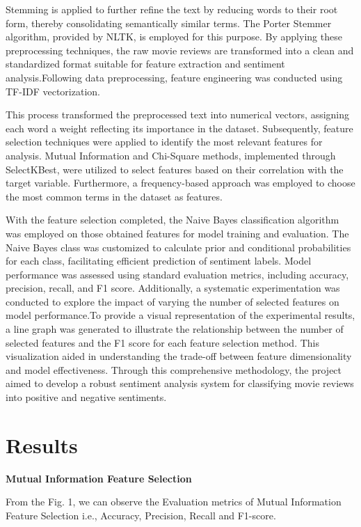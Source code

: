 \documentclass[acmlarge,nonacm,12pt]{acmart}
\begin{document}
Stemming is applied to further refine the text by reducing words to their root form, thereby consolidating semantically similar terms. The Porter Stemmer algorithm, provided by NLTK, is employed for this purpose. By applying these preprocessing techniques, the raw movie reviews are transformed into a clean and standardized format suitable for feature extraction and sentiment analysis.Following data preprocessing, feature engineering was conducted using TF-IDF vectorization. 

This process transformed the preprocessed text into numerical vectors, assigning each word a weight reflecting its importance in the dataset. Subsequently, feature selection techniques were applied to identify the most relevant features for analysis. Mutual Information and Chi-Square methods, implemented through SelectKBest, were utilized to select features based on their correlation with the target variable. Furthermore, a frequency-based approach was employed to choose the most common terms in the dataset as features.

With the feature selection completed, the Naive Bayes classification algorithm was employed on those obtained features for model training and evaluation. The Naive Bayes class was customized to calculate prior and conditional probabilities for each class, facilitating efficient prediction of sentiment labels. Model performance was assessed using standard evaluation metrics, including accuracy, precision, recall, and F1 score. Additionally, a systematic experimentation was conducted to explore the impact of varying the number of selected features on model performance.To provide a visual representation of the experimental results, a line graph was generated to illustrate the relationship between the number of selected features and the F1 score for each feature selection method. This visualization aided in understanding the trade-off between feature dimensionality and model effectiveness. Through this comprehensive methodology, the project aimed to develop a robust sentiment analysis system for classifying movie reviews into positive and negative sentiments.

\section{Results}

\textbf{Mutual Information Feature Selection}

From the Fig. 1, we can observe the Evaluation metrics of Mutual Information Feature Selection i.e., Accuracy, Precision, Recall and F1-score.
\end{document}
